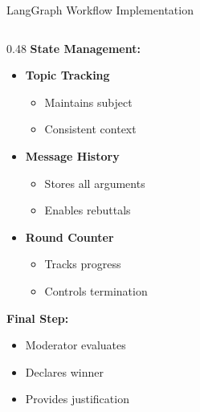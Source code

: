 \documentclass[aspectratio=169]{beamer}
\begin{document}
\begin{frame}{LangGraph Workflow Implementation}
\begin{columns}
        \begin{column}{0.48\textwidth}
            \textbf{State Management:}
            \begin{itemize}
                \small
                \item \textbf{Topic Tracking}
                \begin{itemize}
                    \footnotesize
                    \item Maintains subject
                    \item Consistent context
                \end{itemize}
                
                \item \textbf{Message History}
                \begin{itemize}
                    \footnotesize
                    \item Stores all arguments
                    \item Enables rebuttals
                \end{itemize}
                
                \item \textbf{Round Counter}
                \begin{itemize}
                    \footnotesize
                    \item Tracks progress
                    \item Controls termination
                \end{itemize}
            \end{itemize}
            
            \vspace{0.2cm}
            
            \textbf{Final Step:}
            \begin{itemize}
                \small
                \item Moderator evaluates
                \item Declares winner
                \item Provides justification
            \end{itemize}
        \end{column}
    \end{columns}
\end{frame}
\end{document}
